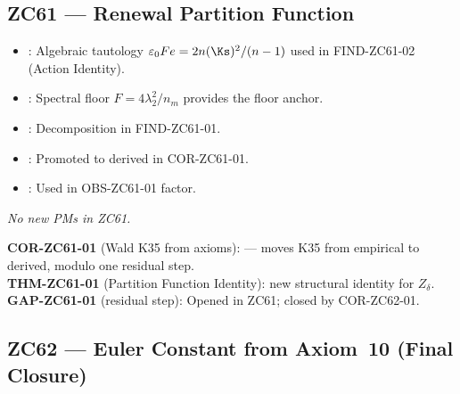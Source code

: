 \documentclass[12pt, a4paper]{article}
\begin{document}
\subsection{ZC61 --- Renewal Partition Function}

\begin{inheritbox}[title={ZC61 Backward Inheritance}]
\begin{itemize}[leftmargin=1.5em]
\item {}: Algebraic
  tautology $\varepsilon_0 F e = 2n(\Ks)^{2}/(n-1)$ used in
  FIND-ZC61-02 (Action Identity).
\item {}: Spectral floor
  $F=4\lambda_{2}^{2}/n_{m}$ provides the floor anchor.
\item {}: Decomposition
  in FIND-ZC61-01.
\item {}: Promoted to
  derived in COR-ZC61-01.
\item {}: Used in
  OBS-ZC61-01 factor.
\end{itemize}
\end{inheritbox}

\begin{correctionbox}[title={ZC61 Forward Corrections / PMs}]
\textit{No new PMs in ZC61.}
\end{correctionbox}

\begin{conmapbox}[title={ZC61 Open / Promotion Record}]
\textbf{COR-ZC61-01} (Wald K35 from axioms): \promotedstar{} ---
moves K35 from empirical to derived, modulo one residual step.\\[0.2em]
\textbf{THM-ZC61-01} (Partition Function Identity): \promotedstar{}
new structural identity for $Z_{\delta}$.\\[0.2em]
\textbf{GAP-ZC61-01} (residual step): Opened in ZC61; closed by
COR-ZC62-01.
\end{conmapbox}

\subsection{ZC62 --- Euler Constant from Axiom~10 (Final Closure)}
\end{document}
